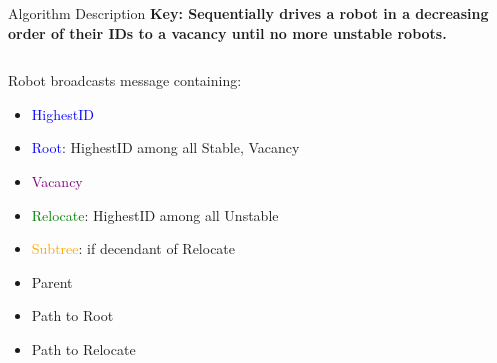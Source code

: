 \begin{frame}{Algorithm Description}
  \textbf{\small{Key: Sequentially drives a robot in a decreasing order of their IDs to a vacancy until no more unstable robots.}}
  \begin{columns}[T] %
    \begin{column}{.5\textwidth}
      \small{
        Robot broadcasts message containing:
        \begin{itemize}
        \item \textcolor{blue}{HighestID} 
        \item \textcolor{blue}{Root}: HighestID among all Stable, Vacancy
        \item \textcolor{purple}{Vacancy}
        \item \textcolor{green}{Relocate}: HighestID among all Unstable 
        \item \textcolor{orange}{Subtree}: if decendant of Relocate
        \item Parent 
        \item Path to Root
        \item Path to Relocate
        \end{itemize}
      }
    \end{column}%
    \begin{column}{.4\textwidth}
      
    \end{column}%
  \end{columns}
\end{frame}